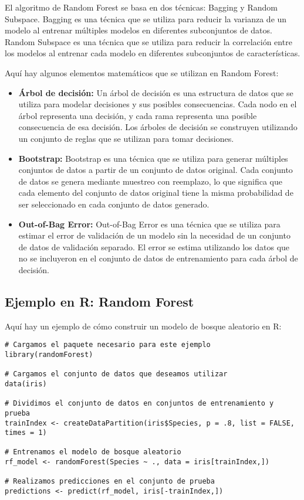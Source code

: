 \documentclass{article}
\begin{document}
El algoritmo de Random Forest se basa en dos técnicas: Bagging y Random Subspace. Bagging es una técnica que se utiliza para reducir la varianza de un modelo al entrenar múltiples modelos en diferentes subconjuntos de datos. Random Subspace es una técnica que se utiliza para reducir la correlación entre los modelos al entrenar cada modelo en diferentes subconjuntos de características.

Aquí hay algunos elementos matemáticos que se utilizan en Random Forest:

\begin{itemize}
    \item \textbf{Árbol de decisión:} Un árbol de decisión es una estructura de datos que se utiliza para modelar decisiones y sus posibles consecuencias. Cada nodo en el árbol representa una decisión, y cada rama representa una posible consecuencia de esa decisión. Los árboles de decisión se construyen utilizando un conjunto de reglas que se utilizan para tomar decisiones.
    \item \textbf{Bootstrap:} Bootstrap es una técnica que se utiliza para generar múltiples conjuntos de datos a partir de un conjunto de datos original. Cada conjunto de datos se genera mediante muestreo con reemplazo, lo que significa que cada elemento del conjunto de datos original tiene la misma probabilidad de ser seleccionado en cada conjunto de datos generado.
    \item \textbf{Out-of-Bag Error:} Out-of-Bag Error es una técnica que se utiliza para estimar el error de validación de un modelo sin la necesidad de un conjunto de datos de validación separado. El error se estima utilizando los datos que no se incluyeron en el conjunto de datos de entrenamiento para cada árbol de decisión.
\end{itemize}

\subsection{Ejemplo en R: Random Forest}

Aquí hay un ejemplo de cómo construir un modelo de bosque aleatorio en R:

\begin{verbatim}
# Cargamos el paquete necesario para este ejemplo
library(randomForest)

# Cargamos el conjunto de datos que deseamos utilizar
data(iris)

# Dividimos el conjunto de datos en conjuntos de entrenamiento y prueba
trainIndex <- createDataPartition(iris$Species, p = .8, list = FALSE, times = 1)

# Entrenamos el modelo de bosque aleatorio
rf_model <- randomForest(Species ~ ., data = iris[trainIndex,])

# Realizamos predicciones en el conjunto de prueba
predictions <- predict(rf_model, iris[-trainIndex,])
\end{verbatim}
\end{document}
